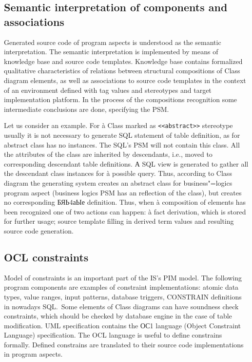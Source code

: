 \documentclass{intech}
\begin{document}
\subsection{Semantic interpretation of components and associations}
\label{sec:sem-int}

Generated source code of program aspects is understood as the semantic interpretation. The semantic interpretation is implemented by means of knowledge base and source code templates. Knowledge base contains formalized qualitative characteristics of relations between structural compositions of Class diagram elements, as well as associations to source code templates in the context of an environment defined with tag values and stereotypes and target implementation platform. In the process of the compositions recognition some intermediate conclusions are done, specifying the PSM.

Let us consider an example. For à Class marked as \texttt{<<abstract>>} stereotype usually it is not necessary to generate SQL statement of table definition, as for abstract class has no instances. The SQL's PSM will not contain this class. All the attributes of the class are inherited by descendants, i.e., moved to corresponding descendant table definitions. А SQL view is generated to gather all the descendant class instances for à possible query. Thus, according to Class diagram the generating system creates an abstract class for business"=logics program aspect (business logics PSM has an reflection of the class), but creates no corresponding БЯЬ4аЫе definition. Thus, when à composition of elements has been recognized one of two actions can happen: à fact derivation, which is stored for further usage; source template filling in derived term values and resulting source code generation.

\subsection{OCL constraints}
\label{sec:sem-OCL}

Model of constraints is an important part of the IS's PIM model. The following program components are examples of constraint implementations: atomic data types, value ranges, input patterns, database triggers, CONSTRAIN definitions in nowadays SQL.~Some elements of Class diagrams can have soundness check constraints, which should be checked by database engine in the case of table modification. UML specification contains the ОС1 language (Object Constraint Language) specification. The OCL language is useful to define constrains formally. Defined constrains are translated to their source code implementations in program aspects.
\end{document}
